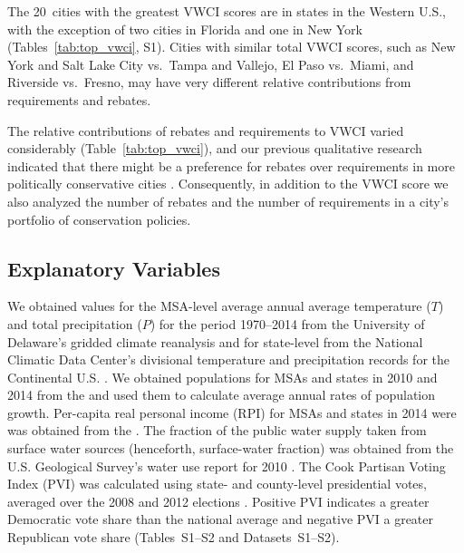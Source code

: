\documentclass[draft,linenumbers]{agujournal}\usepackage{knitr}
\begin{document}
The 20~cities with the greatest VWCI scores are in states in the Western U.S., with the exception of two cities in Florida and one in New York (Tables~\ref{tab:top_vwci}, S1). Cities with similar total VWCI scores, such as New York and Salt Lake City vs.\ Tampa and Vallejo, El Paso vs.\ Miami, and Riverside vs.\ Fresno, may have very different relative contributions from requirements and rebates.

The relative contributions of rebates and requirements to VWCI varied considerably (Table~\ref{tab:top_vwci}), and our previous qualitative research indicated that there might be a preference for rebates over requirements in more politically conservative cities \citep{hess_drought_2016,brown_politics_2016}. Consequently, in addition to the VWCI score we also analyzed the number of rebates and the number of requirements in a city's portfolio of conservation policies.

\subsection{Explanatory Variables}
We obtained values for the MSA-level average annual average temperature ($T$) and total precipitation ($P$) for the period 1970--2014 from the University of Delaware's gridded climate reanalysis \citep{matsuura_gridded_temp_2015,matsuura_gridded_precip_2015} and for state-level from the National Climatic Data Center's divisional temperature and precipitation records for the Continental U.S. \citep{vose_nclimdiv_2014}.
We obtained populations for MSAs and states in 2010 and 2014 from the \citet{census_population_2015} and used them to calculate average annual rates of population growth.
Per-capita real personal income (RPI) for MSAs and states in 2014  were was obtained from the \citet{bea_rpi_2016}.
The fraction of the public water supply taken from surface water sources (henceforth, surface-water fraction) was obtained from the U.S. Geological Survey's water use report for 2010 \citep{maupin_water_use_2014}.
The Cook Partisan Voting Index (PVI) was calculated using state- and county-level presidential votes, averaged over the 2008 and 2012 elections \citep{cook_pvi_2013, cq_elections_2016}. Positive PVI indicates a greater Democratic vote share than the national average and negative PVI a greater Republican vote share (Tables~S1--S2 and Datasets~S1--S2).
\end{document}
